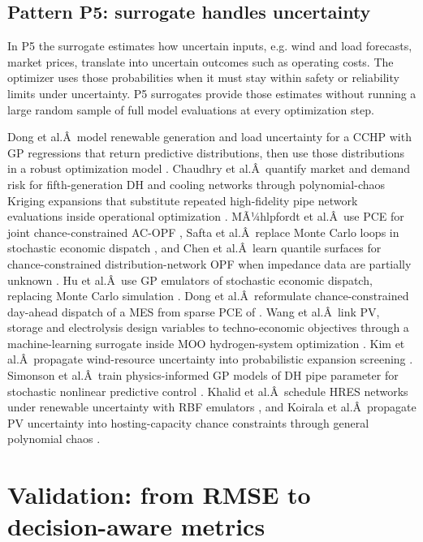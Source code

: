 \documentclass[final,5p,times,twocolumn]{elsarticle}
\begin{document}
\subsection{Pattern P5: surrogate handles uncertainty}
\label{sec:int:uncertainty}

In P5 the surrogate estimates how uncertain inputs, e.g. wind and load
forecasts, market prices, translate into uncertain outcomes such as
operating costs. The optimizer uses those probabilities when it must
stay within safety or reliability limits under uncertainty. P5
surrogates provide those estimates without running a large random sample
of full model evaluations at every optimization step.

Dong et al.Â~model renewable generation and load uncertainty for a CCHP
with GP regressions that return predictive distributions, then use those
distributions in a robust optimization model \cite{Dong2022}. Chaudhry et
al.Â~quantify market and demand risk for fifth-generation DH and cooling
networks through polynomial-chaos Kriging expansions that substitute
repeated high-fidelity pipe network evaluations inside operational
optimization \cite{Chaudhry2024}. MÃ¼hlpfordt et al.Â~use PCE for joint
chance-constrained AC-OPF \cite{Muhlpfordt20194806}, Safta et al.Â~replace
Monte Carlo loops in stochastic economic dispatch \cite{Safta20172535}, and
Chen et al.Â~learn quantile surfaces for chance-constrained
distribution-network OPF when impedance data are partially unknown
\cite{Chen2023657}. Hu et al.Â~use GP emulators of stochastic economic
dispatch, replacing Monte Carlo simulation \cite{Hu2020,Hu2021671}. Dong
et al.Â~reformulate chance-constrained day-ahead dispatch of a MES from
sparse PCE of \cite{Dong2023}. Wang et al.Â~link PV, storage and electrolysis
design variables to techno-economic objectives through a
machine-learning surrogate inside MOO hydrogen-system optimization
\cite{Wang2024}. Kim et al.Â~propagate wind-resource uncertainty into
probabilistic expansion screening \cite{Kim2021}. Simonson et al.Â~train
physics-informed GP models of DH pipe parameter for stochastic nonlinear
predictive control \cite{Simonson202036}. Khalid et al.Â~schedule HRES
networks under renewable uncertainty with RBF emulators
\cite{Khalid20241959}, and Koirala et al.Â~propagate PV uncertainty into
hosting-capacity chance constraints through general polynomial chaos
\cite{Koirala20242284}.

\section{Validation: from RMSE to decision-aware metrics}
\label{sec:validation}
\end{document}
